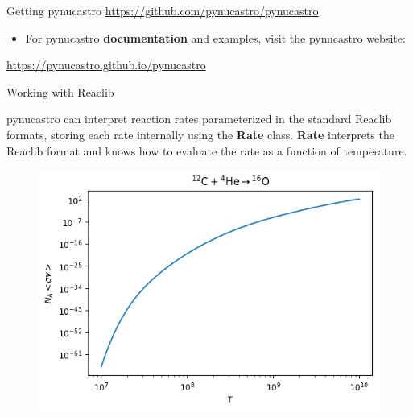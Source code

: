 \documentclass[final]{beamer}
\newlength{\onecolwid}
\newcommand{\isotm}[2]{{}^{#2}\mathrm{#1}}
\begin{document}
\begin{frame}[t]
\begin{columns}[t]
\begin{column}{\onecolwid}
\begin{block}{Getting pynucastro}
\url{https://github.com/pynucastro/pynucastro}

\begin{itemize}
\item For pynucastro \textbf{documentation} and examples, visit the pynucastro website:
\end{itemize}

\url{https://pynucastro.github.io/pynucastro}

\end{block}




\begin{block}{Working with Reaclib}

pynucastro can interpret reaction rates parameterized in the standard
Reaclib formats, storing each rate internally
using the \textbf{Rate} class. \textbf{Rate} interprets the Reaclib
format and knows how to evaluate the rate as a function of
temperature.

\begin{figure}
\includegraphics[width=\linewidth]{figures/library-examples-filtering_cago.png}
\end{figure}

\end{block}





\end{column}
\end{columns}
\end{frame}
\end{document}
